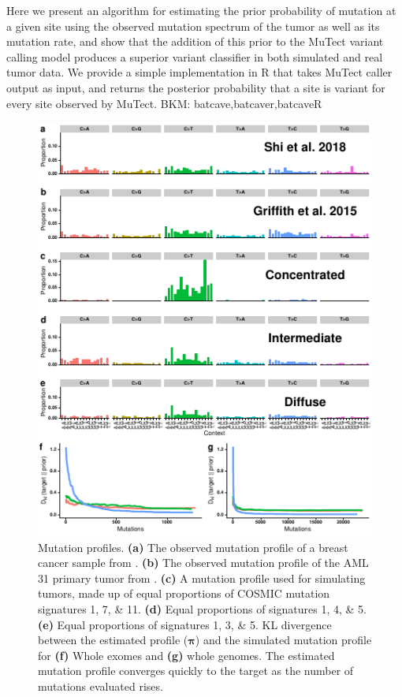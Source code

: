 \documentclass[a4,center,fleqn]{NAR}
\newcommand{\bkmcomment}[1]{{\color{blue}BKM: #1}}
\begin{document}
Here we present an algorithm for estimating the prior probability of mutation at a given site using the observed mutation spectrum of the tumor as well as its mutation rate, and show that the addition of this prior to the MuTect variant calling model produces a superior variant classifier in both simulated and real tumor data.
We provide a simple implementation in R that takes MuTect caller output as input, and returns the posterior probability that a site is variant for every site observed by MuTect. \bkmcomment{batcave,batcaver,batcaveR}

\begin{figure}
  \begin{center}
  \includegraphics{figures/signature_figure.pdf}
  \end{center}
  \caption{Mutation profiles. 
  \textbf{(a)} The observed mutation profile of a breast cancer sample from \cite{Shi2018}.
  \textbf{(b)} The observed mutation profile of the AML 31 primary tumor from \cite{Griffith2015}.
  \textbf{(c)} A mutation profile used for simulating tumors, made up of equal proportions of COSMIC mutation signatures 1, 7, \& 11.
  \textbf{(d)} Equal proportions of signatures 1, 4, \& 5.
  \textbf{(e)} Equal proportions of signatures 1, 3, \& 5.
  KL divergence between the estimated profile ($\boldsymbol{\pi}$) and the simulated mutation profile for \textbf{(f)} Whole exomes and \textbf{(g)} whole genomes.
  The estimated mutation profile converges quickly to the target as the number of mutations evaluated rises.
  }
  \label{NAR-sigfig}
  \end{figure}
\end{document}
